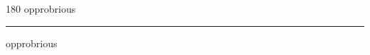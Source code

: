 
\begin{frame}
\begin{center}
\begin{turn}{180}
{\fontsize{2.5cm}{1em}\selectfont opprobrious}
\end{turn}
\vspace{1em}\par  
\hrule
\vspace{1em}\par  
{\fontsize{2.5cm}{1em}\selectfont opprobrious}
\end{center}
\end{frame}
